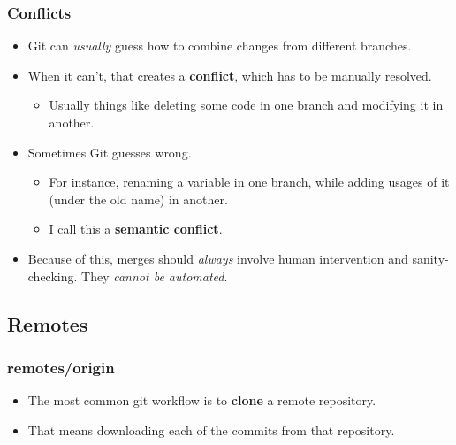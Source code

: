 \documentclass{beamer}
\begin{document}
\begin{frame}
\begin{center}
  \end{center}
\end{frame}

\begin{frame}
  \frametitle{Conflicts}
  \begin{itemize}
    \pause
  \item Git can \textit{usually} guess how to combine changes from different branches.
    \pause
  \item When it can't, that creates a \textbf{conflict}, which has to be manually resolved.
    \begin{itemize}
      \pause
    \item Usually things like deleting some code in one branch and modifying it in another.
    \end{itemize}
    \pause
  \item Sometimes Git guesses wrong.
    \begin{itemize}
      \pause
    \item For instance, renaming a variable in one branch, while adding usages of it (under the old name) in another.
      \pause
    \item I call this a \textbf{semantic conflict}.
    \end{itemize}
  \item Because of this, merges should \textit{always} involve human intervention and sanity-checking. They \textit{cannot be automated}.
  \end{itemize}
\end{frame}

\subsection{Remotes}

\begin{frame}
  \frametitle{remotes/origin}
  \begin{itemize}
    \pause
  \item The most common git workflow is to \textbf{clone} a remote repository.
    \pause
  \item That means downloading each of the commits from that repository.
  \end{itemize}
\end{frame}
\end{document}

